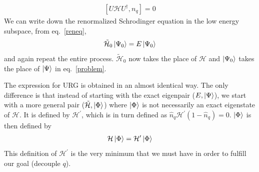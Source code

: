 \begin{equation}\begin{aligned}
	\left[U \mathcal{H} U^\dagger, n_q\right] = 0
\end{aligned}\end{equation}
We can write down the renormalized Schrodinger equation in the low energy subspace, from eq.~\ref{reneq},
\begin{equation}\begin{aligned}
	\tilde{\mathcal{H}}_0 \ket{\Psi_0} = E\ket{\Psi_0}
\end{aligned}\end{equation}
and again repeat the entire process. \(\tilde{\mathcal{H}}_0\) now takes the place of \(\mathcal{H}\) and \(\ket{\Psi_0}\) takes the place of \(\ket{\Psi}\) in eq.~\ref{problem}.

The expression for URG is obtained in an almost identical way. The only difference is that instead of starting with the exact eigenpair (\(E,\ket{\Psi}\)), we start with a more general pair (\(\tilde{\mathcal{H}}, \ket{\Phi}\)) where \(\ket{\Phi}\) is not necessarily an exact eigenstate of \(\mathcal{H}\). It is defined by \(\mathcal{H}^\prime\), which is in turn defined as \(\hat n_q \mathcal{H}^\prime\left(1 - \hat n_q\right) = 0\). \(\ket{\Phi}\) is then defined by
\begin{equation}\begin{aligned}
\mathcal{H}\ket{\Phi} = \mathcal{H}^\prime \ket{\Phi}
\end{aligned}\end{equation}
This definition of \(\mathcal{H}^\prime\) is the very minimum that we must have in order to fulfill our goal (decouple \(q\)). 

